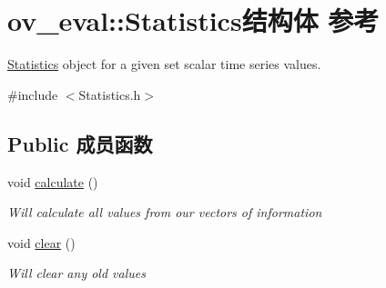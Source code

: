 \hypertarget{structov__eval_1_1Statistics}{}\section{ov\+\_\+eval\+:\+:Statistics结构体 参考}
\label{structov__eval_1_1Statistics}


\hyperlink{structov__eval_1_1Statistics}{Statistics} object for a given set scalar time series values.  




{\ttfamily \#include $<$Statistics.\+h$>$}

\subsection*{Public 成员函数}
\begin{DoxyCompactItemize}
\item 
\mbox{\label{structov__eval_1_1Statistics_ada896c0243989b2b8a366a0caa18a3c6}} 
void \hyperlink{structov__eval_1_1Statistics_ada896c0243989b2b8a366a0caa18a3c6}{calculate} ()
\begin{DoxyCompactList}\small\item\em Will calculate all values from our vectors of information \end{DoxyCompactList}\item 
\mbox{\label{structov__eval_1_1Statistics_ad13e2a500d7c64297077485e39b36a6c}} 
void \hyperlink{structov__eval_1_1Statistics_ad13e2a500d7c64297077485e39b36a6c}{clear} ()
\begin{DoxyCompactList}\small\item\em Will clear any old values \end{DoxyCompactList}\end{DoxyCompactItemize}
